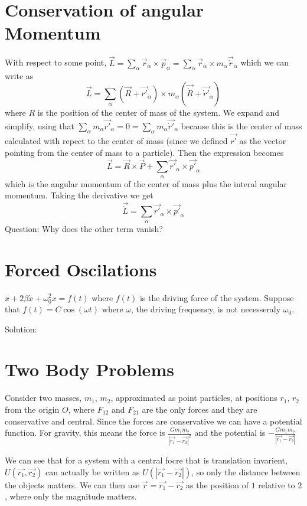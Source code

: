\documentclass{homework}
\begin{document}
\section{Conservation of angular Momentum}
With respect to some point, $\vec{L} = \sum_{\alpha}\vec{r}_{\alpha} \times \vec{p}_{\alpha} = \sum_{\alpha}\vec{r}_{\alpha} \times  m_{\alpha}\vec{\dot{r}}_{\alpha}$ which we can write as 
\[\vec{L} = \sum_{\alpha} (\vec{R} + \vec{r'}_{\alpha}) \times m_{\alpha}(\vec{\dot{R}} + \vec{\dot{r}'}_{\alpha})\]
where $R$ is the position of the center of mass of the system. We expand and simplify, using that $\sum_{\alpha}m_{\alpha}\vec {r'}_{\alpha} = 0= \sum_{\alpha}m_{\alpha}\vec {\dot{r}'}_{\alpha}$ because this is the center of mass calculated with repect to the center of mass (since we defined $\vec{r'}$ as the vector pointing from the center of mass to a particle). Then the expression becomes
\[\vec{L} = \vec{R} \times \vec{P} + \sum_{\alpha}\vec{r'}_{\alpha} \times \vec{p'}_{\alpha}\]
which is the angular momentum of the center of mass plus the interal angular momentum. 
Taking the derivative we get
\[\vec{\dot{L}} = \sum_{\alpha}\vec{r'}_{\alpha} \times \vec{p'}_{\alpha}\]
Question: Why does the other term vanish?




\section{Forced Oscilations}

$\ddot x + 2\beta \dot x + \omega_0^2 x = f(t)$ where $f(t)$ is the driving force of the system. Suppose that $f(t) = C \cos (\omega t)$ where $\omega$, the driving frequency, is not necesseraly $\omega_0$. 

Solution: 




\section{Two Body Problems}

Consider two masses, $m_1$, $m_2$, approximated as point particles, at positions $r_1$, $r_2$ from the origin $O$, where $F_{12}$ and $F_{21}$ are the only forces and they are conservative and central.
Since the forces are conservative we can have a potential function. For gravity, this means the force is $\frac{Gm_1m_2}{|\vec{r_1} - \vec{r_2}|^2}$ and the potential is  $-\frac{Gm_1m_2}{|\vec{r_1} - \vec{r_2}|}$

We can see that for a system with a central focre that is translation invarient, $U(\vec{r_1},\vec{r_2})$ can actually be written as $U(|\vec{r_1}-\vec{r_2}|)$, so only the distance between the objects matters. We can then use $\vec{r} = \vec{r_1} - \vec{r_2}$ as the position of $1$ relative to $2$, where only the magnitude matters.
\end{document}
